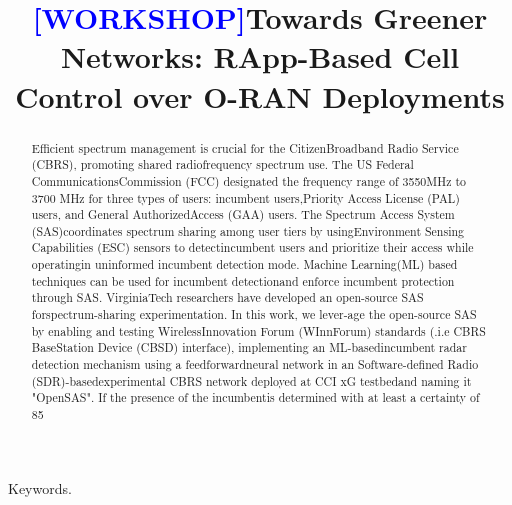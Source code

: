 \documentclass[conference]{IEEEtran}
\begin{document}
\title{\textcolor{blue}{[WORKSHOP]}Towards Greener Networks: RApp-Based Cell Control over O-RAN Deployments}

\author{
}

\maketitle

\begin{abstract}
Efficient spectrum management is crucial for the CitizenBroadband Radio Service (CBRS), promoting shared radiofrequency spectrum use. The US Federal CommunicationsCommission (FCC) designated the frequency range of 3550MHz to 3700 MHz for three types of users: incumbent users,Priority Access License (PAL) users, and General AuthorizedAccess (GAA) users. The Spectrum Access System (SAS)coordinates spectrum sharing among user tiers by usingEnvironment Sensing Capabilities (ESC) sensors to detectincumbent users and prioritize their access while operatingin uninformed incumbent detection mode. Machine Learning(ML) based techniques can be used for incumbent detectionand enforce incumbent protection through SAS. VirginiaTech researchers have developed an open-source SAS forspectrum-sharing experimentation. In this work, we lever-age the open-source SAS by enabling and testing WirelessInnovation Forum (WInnForum) standards (.i.e CBRS BaseStation Device (CBSD) interface), implementing an ML-basedincumbent radar detection mechanism using a feedforwardneural network in an Software-defined Radio (SDR)-basedexperimental CBRS network deployed at CCI xG testbedand naming it "OpenSAS". If the presence of the incumbentis determined with at least a certainty of 85%
\end{abstract}

\begin{IEEEkeywords}
Keywords.
\end{IEEEkeywords}
\end{document}
